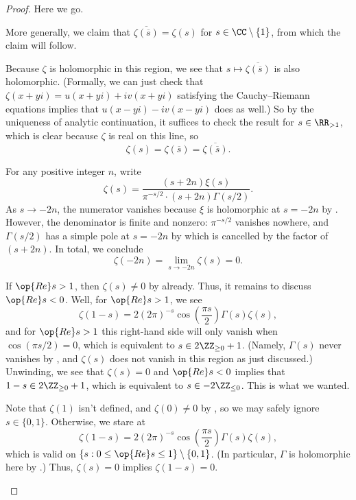 \documentclass[../notes.tex]{subfiles}
\begin{document}
\begin{proof}
	Here we go.
	\begin{listalph}
		\item More generally, we claim that $\overline{\zeta(\overline s)}=\zeta(s)$ for $s\in\CC\setminus\{1\}$, from which the claim will follow.
		
		Because $\zeta$ is holomorphic in this region, we see that $s\mapsto\overline{\zeta(\overline s)}$ is also holomorphic. (Formally, we can just check that $\zeta(x+yi)=u(x+yi)+iv(x+yi)$ satisfying the Cauchy--Riemann equations implies that $u(x-yi)-iv(x-yi)$ does as well.) So by the uniqueness of analytic continuation, it suffices to check the result for $s\in\RR_{>1}$, which is clear because $\zeta$ is real on this line, so
		\[\zeta(s)=\zeta(\overline s)=\overline{\zeta(\overline s)}.\]

		\item For any positive integer $n$, write
		\[\zeta(s)=\frac{(s+2n)\xi(s)}{\pi^{-s/2}\cdot(s+2n)\Gamma(s/2)}.\]
		As $s\to-2n$, the numerator vanishes because $\xi$ is holomorphic at $s=-2n$ by . However, the denominator is finite and nonzero: $\pi^{-s/2}$ vanishes nowhere, and $\Gamma(s/2)$ has a simple pole at $s=-2n$ by  which is cancelled by the factor of $(s+2n)$. In total, we conclude
		\[\zeta(-2n)=\lim_{s\to-2n}\zeta(s)=0.\]

		\item If $\op{Re}s>1$, then $\zeta(s)\ne0$ by  already. Thus, it remains to discuss $\op{Re}s<0$. Well, for $\op{Re}s>1$, we see
		\[\zeta(1-s)=2(2\pi)^{-s}\cos\left(\frac{\pi s}2\right)\Gamma(s)\zeta(s),\]
		and for $\op{Re}s>1$ this right-hand side will only vanish when $\cos(\pi s/2)=0$, which is equivalent to $s\in2\ZZ_{\ge0}+1$. (Namely, $\Gamma(s)$ never vanishes by , and $\zeta(s)$ does not vanish in this region as just discussed.) Unwinding, we see that $\zeta(s)=0$ and $\op{Re}s<0$ implies that $1-s\in2\ZZ_{\ge0}+1$, which is equivalent to $s\in-2\ZZ_{\le0}$. This is what we wanted.

		\item Note that $\zeta(1)$ isn't defined, and $\zeta(0)\ne0$ by , so we may safely ignore $s\in\{0,1\}$. Otherwise, we stare at
		\[\zeta(1-s)=2(2\pi)^{-s}\cos\left(\frac{\pi s}2\right)\Gamma(s)\zeta(s),\]
		which is valid on $\{s:0\le\op{Re}s\le1\}\setminus\{0,1\}$. (In particular, $\Gamma$ is holomorphic here by .) Thus, $\zeta(s)=0$ implies $\zeta(1-s)=0$.
		\qedhere
	\end{listalph}
\end{proof}
\end{document}
